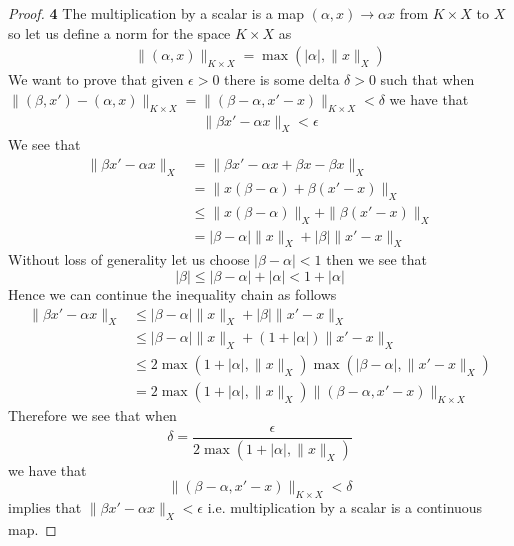 \documentclass[11pt]{article}
\theoremstyle{definition}
\begin{document}
\begin{proof}{\textbf{4}}
    The multiplication by a scalar is a map $(\alpha, x) \to \alpha x$ from
    $K \times X$ to $X$ so
    let us define a norm for the space $K \times X$ as 
    \begin{align*}
        \|(\alpha, x)\|_{K\times X} = \max(|\alpha|, \|x\|_X)
    \end{align*}
    We want to prove that given $\epsilon > 0$ there is some delta $\delta > 0$
    such that when
    $\|(\beta, x') - (\alpha, x)\|_{K \times X} =
    \|(\beta-\alpha, x'-x)\|_{K \times X} < \delta$ we have that
    \begin{align*}
        \|\beta x' - \alpha x\|_X < \epsilon
    \end{align*}
    We see that
    \begin{align*}
        \|\beta x' - \alpha x\|_X
            &= \|\beta x' - \alpha x + \beta x - \beta x\|_X\\
            &= \|x (\beta - \alpha) + \beta(x' - x)\|_X\\
            &\leq \|x (\beta - \alpha)\|_X  + \|\beta(x' - x)\|_X\\
            &= |\beta - \alpha|\|x\|_X  + |\beta|\|x' - x\|_X
    \end{align*}
    Without loss of generality let us choose $|\beta - \alpha| < 1$
    then we see that
    $$|\beta| \leq |\beta - \alpha|  + |\alpha| < 1 + |\alpha|$$
    Hence we can continue the inequality chain as follows
    \begin{align*}
        \|\beta x' - \alpha x\|_X
            &\leq |\beta - \alpha|\|x\|_X  + |\beta|\|x' - x\|_X\\
            &\leq |\beta - \alpha|\|x\|_X  + (1 + |\alpha|)\|x' - x\|_X\\
            &\leq 2\max(1 + |\alpha|, \|x\|_X)\max(|\beta - \alpha|, \|x' - x\|_X)\\
            &= 2\max(1 + |\alpha|, \|x\|_X)
            \|(\beta - \alpha, x' - x)\|_{K\times X}
    \end{align*}
    Therefore we see that when
    $$\delta = \frac{\epsilon}{2\max(1 + |\alpha|, \|x\|_X)}$$
    we have that
    $$\|(\beta - \alpha,x' - x)\|_{K \times X} < \delta$$ implies that
    $\|\beta x'- \alpha x\|_X < \epsilon$ i.e. multiplication by a scalar is a
    continuous map.
\end{proof}
\end{document}
